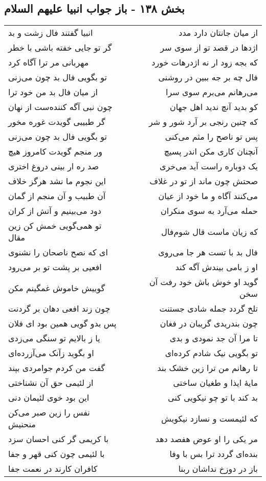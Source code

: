 \begin{center}
\section*{بخش ۱۳۸ - باز جواب انبیا علیهم السلام}
\label{sec:sh138}
\begin{longtable}{l p{0.5cm} r}
انبیا گفتند فال زشت و بد
&&
از میان جانتان دارد مدد
\\
گر تو جایی خفته باشی با خطر
&&
اژدها در قصد تو از سوی سر
\\
مهربانی مر ترا آگاه کرد
&&
که بجه زود ار نه اژدرهات خورد
\\
تو بگویی فال بد چون می‌زنی
&&
فال چه بر جه ببین در روشنی
\\
از میان فال بد من خود ترا
&&
می‌رهانم می‌برم سوی سرا
\\
چون نبی آگه کننده‌ست از نهان
&&
کو بدید آنچ ندید اهل جهان
\\
گر طبیبی گویدت غوره مخور
&&
که چنین رنجی بر آرد شور و شر
\\
تو بگویی فال بد چون می‌زنی
&&
پس تو ناصح را مثم می‌کنی
\\
ور منجم گویدت کامروز هیچ
&&
آنچنان کاری مکن اندر پسیچ
\\
صد ره ار بینی دروغ اختری
&&
یک دوباره راست آید می‌خری
\\
این نجوم ما نشد هرگز خلاف
&&
صحتش چون ماند از تو در غلاف
\\
آن طبیب و آن منجم از گمان
&&
می‌کنند آگاه و ما خود از عیان
\\
دود می‌بینیم و آتش از کران
&&
حمله می‌آرد به سوی منکران
\\
تو همی‌گویی خمش کن زین مقال
&&
که زیان ماست قال شوم‌فال
\\
ای که نصح ناصحان را نشنوی
&&
فال بد با تست هر جا می‌روی
\\
افعیی بر پشت تو بر می‌رود
&&
او ز بامی بیندش آگه کند
\\
گوییش خاموش غمگینم مکن
&&
گوید او خوش باش خود رفت آن سخن
\\
چون زند افعی دهان بر گردنت
&&
تلخ گردد جمله شادی جستنت
\\
پس بدو گویی همین بود ای فلان
&&
چون بندریدی گریبان در فغان
\\
یا ز بالایم تو سنگی می‌زدی
&&
تا مرا آن جد نمودی و بدی
\\
او بگوید زآنک می‌آزرده‌ای
&&
تو بگویی نیک شادم کرده‌ای
\\
گفت من کردم جوامردی بپند
&&
تا رهانم من ترا زین خشک بند
\\
از لئیمی حق آن نشناختی
&&
مایهٔ ایذا و طغیان ساختی
\\
این بود خوی لئیمان دنی
&&
بد کند با تو چو نیکویی کنی
\\
نفس را زین صبر می‌کن منحنیش
&&
که لئیمست و نسازد نیکویش
\\
با کریمی گر کنی احسان سزد
&&
مر یکی را او عوض هفصد دهد
\\
با لئیمی چون کنی قهر و جفا
&&
بنده‌ای گردد ترا بس با وفا
\\
کافران کارند در نعمت جفا
&&
باز در دوزخ نداشان ربنا
\\
\end{longtable}
\end{center}
